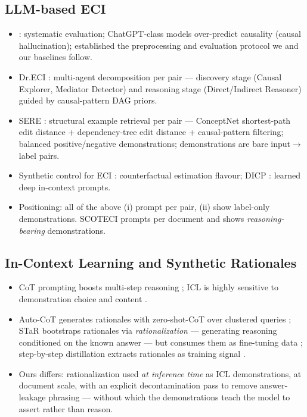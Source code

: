 \documentclass[11pt]{article}
\newcommand{\method}{SCOTECI}
\begin{document}
\subsection{LLM-based ECI}
\begin{itemize}
  \item \citet{gao2023chatgpt}: systematic evaluation; ChatGPT-class models
        over-predict causality (causal hallucination); established the
        preprocessing and evaluation protocol we and our baselines follow.
  \item Dr.ECI \citep{cai2025dreci}: multi-agent decomposition per pair ---
        discovery stage (Causal Explorer, Mediator Detector) and reasoning stage
        (Direct/Indirect Reasoner) guided by causal-pattern DAG priors.
  \item SERE \citep{hao2026sere}: structural example retrieval per pair ---
        ConceptNet shortest-path edit distance + dependency-tree edit distance +
        causal-pattern filtering; balanced positive/negative demonstrations;
        demonstrations are bare input$\to$label pairs.
  \item Synthetic control for ECI \citep{wang2024synthetic}: counterfactual
        estimation flavour; DICP \citep{mu2025dicp}: learned deep in-context
        prompts.
  \item Positioning: all of the above (i) prompt per pair, (ii) show label-only
        demonstrations. \method{} prompts per document and shows
        \emph{reasoning-bearing} demonstrations.
\end{itemize}

\subsection{In-Context Learning and Synthetic Rationales}
\begin{itemize}
  \item CoT prompting boosts multi-step reasoning \citep{wei2022chain}; ICL is
        highly sensitive to demonstration choice and content
        \citep{liu2022makes, min2022rethinking}.
  \item Auto-CoT generates rationales with zero-shot-CoT over clustered queries
        \citep{zhang2023autocot}; STaR bootstraps rationales via
        \emph{rationalization} --- generating reasoning conditioned on the known
        answer --- but consumes them as fine-tuning data \citep{zelikman2022star};
        step-by-step distillation extracts rationales as training signal
        \citep{hsieh2023distilling}.
  \item Ours differs: rationalization used \emph{at inference time} as ICL
        demonstrations, at document scale, with an explicit decontamination pass
        to remove answer-leakage phrasing --- without which the demonstrations
        teach the model to assert rather than reason.
\end{itemize}
\end{document}
